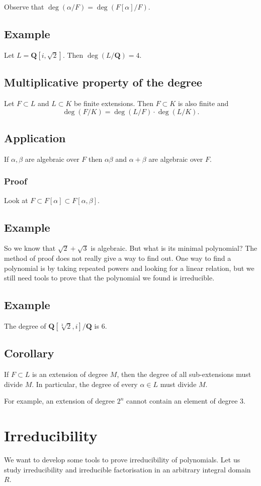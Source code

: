 \documentclass[11pt]{article}
\begin{document}
Observe that \(\deg(\alpha/F) = \deg(F[\alpha]/F)\).
\subsection{Example}
\label{sec:org14cbec6}
Let \(L = \mathbf{Q}[i, \sqrt 2]\).
Then \(\deg (L / \mathbf{Q}) = 4\).
\subsection{Multiplicative property of the degree}
\label{sec:org3bb0654}
Let \(F \subset L\) and \(L \subset K\) be finite extensions.
Then \(F \subset K\) is also finite and
\[ \deg(F/K) = \deg(L/F) \cdot \deg (L/K).\]
\subsection{Application}
\label{sec:org4c7dea5}
If \(\alpha, \beta\) are algebraic over \(F\) then \(\alpha\beta\) and \(\alpha+\beta\) are algebraic over \(F\).
\subsubsection{Proof}
\label{sec:org4bdb519}
Look at \(F \subset F[\alpha] \subset F[\alpha,\beta]\).
\subsection{Example}
\label{sec:org064faef}
So we know that \(\sqrt 2 + \sqrt 3\) is algebraic.
But what is its minimal polynomial?
The method of proof does not really give a way to find out.
One way to find a polynomial is by taking repeated powers and looking for a linear relation, but we still need tools to prove that the polynomial we found is irreducible.
\subsection{Example}
\label{sec:org1a1cc55}
The degree of \(\mathbf{Q}[\sqrt[3]2, i] / \mathbf{Q}\) is 6.
\subsection{Corollary}
\label{sec:org99ca852}
If \(F \subset L\) is an extension of degree \(M\), then the degree of all sub-extensions must divide \(M\).
In particular, the degree of every \(\alpha \in L\) must divide \(M\).

For example, an extension of degree \(2^{n}\) cannot contain an element of degree 3.
\section{Irreducibility}
\label{sec:org59f5d48}
We want to develop some tools to prove irreducibility of polynomials.
Let us study irreducibility and irreducible factorisation in an arbitrary integral domain \(R\).
\end{document}
